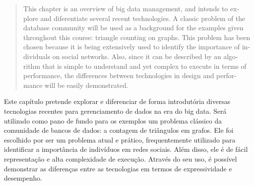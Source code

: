 \begin{abstract}
\begin{otherlanguage}{english}
This chapter is an overview of big data management, and
intends to explore and diferentiate several recent technologies. A
classic problem of the database community will be used as a background for the 
examples given throughout this course: triangle counting on graphs. This 
problem has been chosen because it is being extensively used to identify 
the importance of individuals on social networks. 
Also, since it can be described by an algorithm that is simple to understand and 
yet complex to execute in terms of performance, the differences between technologies
in design and performance will be easily demonstrated. 
\end{otherlanguage}
\end{abstract}

\begin{resumo}
Este capítulo pretende explorar e diferenciar de forma introdutória diversas 
tecnologias recentes
para gerenciamento de dados na era do big data. Será utilizado como pano de fundo para os
exemplos um problema clássico da comunidade de bancos de dados: a contagem de triângulos
em grafos. Ele foi escolhido por ser um problema atual e prático, frequentemente 
utilizado para identificar a importância de indivíduos em redes sociais. Além disso, ele é de
fácil representação e alta complexidade de execução. Através do seu uso, é possível demonstrar
as diferenças entre as tecnologias em termos de expressividade e desempenho. 
\end{resumo}

